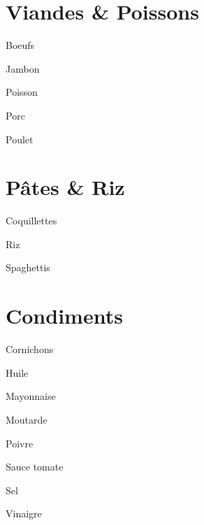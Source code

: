 \documentclass[8pt,landscape,a4paper]{article}
\begin{document}
\begin{multicols*}{4}
    \section{Viandes \& Poissons}
    \begin{todolist}
    \item Boeufs
    \item Jambon
    \item Poisson
    \item Porc
    \item Poulet
    \item 
    \item 
    \item 
    \item 
    \item 
    \item 
    \item 
    \end{todolist}

    \section{Pâtes \& Riz}
    \begin{todolist}
    \item Coquillettes
    \item Riz
    \item Spaghettis
    \item 
    \item 
    \item 
    \end{todolist}

    \section{Condiments}
    \begin{todolist}
    \item Cornichons 
    \item Huile
    \item Mayonnaise
    \item Moutarde
    \item Poivre
    \item Sauce tomate
    \item Sel
    \item Vinaigre
    \item 
    \item 
    \item 
    \item 
    \item 
    \item 
    \end{todolist}


\end{multicols*}
\end{document}
